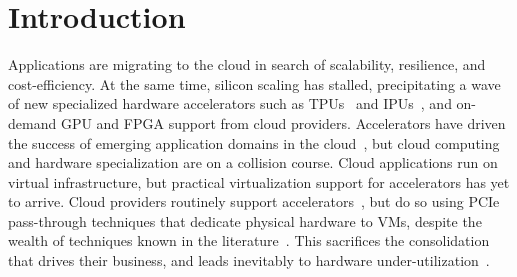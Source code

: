 
\section{Introduction}
\label{s:intro}

Applications are migrating to the cloud
in search of scalability, resilience, and cost-efficiency. At the same
time, silicon scaling has stalled, precipitating a wave
of new specialized hardware accelerators such as TPUs~\cite{jouppi2016google} and IPUs~\cite{graphcore},
and on-demand GPU and FPGA support from cloud providers.
Accelerators have driven the success of emerging application domains in the cloud~\cite{mlmovetocloud, genomicscloud},
but cloud computing and hardware specialization are on a collision course.
Cloud applications run on virtual infrastructure, %
but practical virtualization support for accelerators has yet to arrive.
Cloud providers routinely support accelerators~\cite{amazon_ec2,google-gpu,google-cmle,gpucloud,amazon_f1,olympus},
but do so using PCIe pass-through techniques that dedicate physical hardware to VMs,
despite the wealth of techniques known in the literature~\cite{vCUDA, gVirt,suzuki2014gpuvm, svga, duato2009efficient, rCUDA, gVirtuS, gupta2009gvim, gottschlag2013logv, kvmgt, vfpgamanager, waldspurger-iovirt, li2011gpu, vasila-gvm16, vmCUDA, yeh2017pagoda,trillium}.
This sacrifices the consolidation that drives their business, and leads inevitably to
hardware under-utilization~\cite{simultaneous_multikernel,improving_gpu,gpl,fiddle}.


